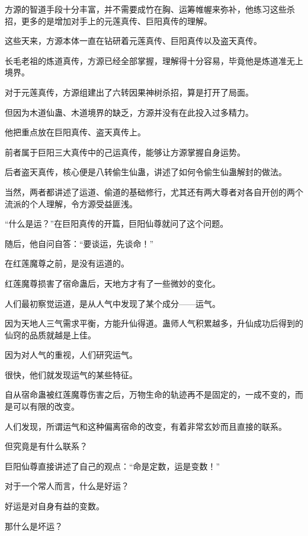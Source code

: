 
\begin{this_body}



方源的智道手段十分丰富，并不需要成竹在胸、运筹帷幄来弥补，他练习这些杀招，更多的是增加对手上的元莲真传、巨阳真传的理解。

这些天来，方源本体一直在钻研着元莲真传、巨阳真传以及盗天真传。

长毛老祖的炼道真传，方源已经全部掌握，理解得十分容易，毕竟他是炼道准无上境界。

对于元莲真传，方源组建出了六转因果神树杀招，算是打开了局面。

但因为木道仙蛊、木道境界的缺乏，方源并没有在此投入过多精力。

他把重点放在巨阳真传、盗天真传上。

前者属于巨阳三大真传中的己运真传，能够让方源掌握自身运势。

后者盗天真传，核心便是八转偷生仙蛊，讲述了如何令偷生仙蛊解封的做法。

当然，两者都讲述了运道、偷道的基础修行，尤其还有两大尊者对各自开创的两个流派的个人理解，令方源受益匪浅。

“什么是运？”在巨阳真传的开篇，巨阳仙尊就问了这个问题。

随后，他自问自答：“要谈运，先谈命！”

在红莲魔尊之前，是没有运道的。

红莲魔尊损害了宿命蛊后，天地方才有了一些微妙的变化。

人们最初察觉运道，是从人气中发现了某个成分——运气。

因为天地人三气需求平衡，方能升仙得道。蛊师人气积累越多，升仙成功后得到的仙窍的品质就越是上佳。

因为对人气的重视，人们研究运气。

很快，他们就发现运气的某些特征。

自从宿命蛊被红莲魔尊伤害之后，万物生命的轨迹再不是固定的，一成不变的，而是可以有限的改变。

人们发现，所谓运气和这种偏离宿命的改变，有着非常玄妙而且直接的联系。

但究竟是有什么联系？

巨阳仙尊直接讲述了自己的观点：“命是定数，运是变数！”

对于一个常人而言，什么是好运？

好运是对自身有益的变数。

那什么是坏运？


\end{this_body}
